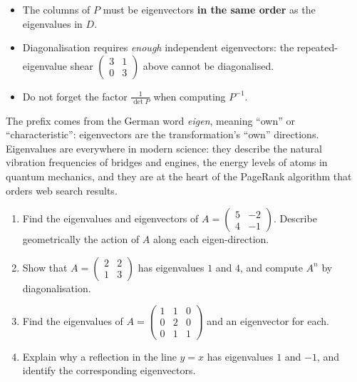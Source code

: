 \documentclass[11pt]{article}
\begin{document}
\begin{attention}
\begin{itemize}
\item The columns of $P$ must be eigenvectors \textbf{in the same order} as the eigenvalues in $D$.
\item Diagonalisation requires \emph{enough} independent eigenvectors: the repeated-eigenvalue shear $\begin{pmatrix}3&1\\0&3\end{pmatrix}$ above cannot be diagonalised.
\item Do not forget the factor $\frac{1}{\det P}$ when computing $P^{-1}$.
\end{itemize}
\end{attention}

\begin{savaistu}
The prefix comes from the German word \emph{eigen}, meaning ``own'' or ``characteristic'': eigenvectors are the transformation's ``own'' directions. Eigenvalues are everywhere in modern science: they describe the natural vibration frequencies of bridges and engines, the energy levels of atoms in quantum mechanics, and they are at the heart of the PageRank algorithm that orders web search results.
\end{savaistu}

\begin{exercice}[Practice]
\begin{enumerate}
\item Find the eigenvalues and eigenvectors of $A=\begin{pmatrix}5&-2\\4&-1\end{pmatrix}$. Describe geometrically the action of $A$ along each eigen-direction.
\item Show that $A=\begin{pmatrix}2&2\\1&3\end{pmatrix}$ has eigenvalues $1$ and $4$, and compute $A^n$ by diagonalisation.
\item Find the eigenvalues of $A=\begin{pmatrix}1&1&0\\0&2&0\\0&1&1\end{pmatrix}$ and an eigenvector for each.
\item Explain why a reflection in the line $y=x$ has eigenvalues $1$ and $-1$, and identify the corresponding eigenvectors.
\end{enumerate}
\end{exercice}
\end{document}
